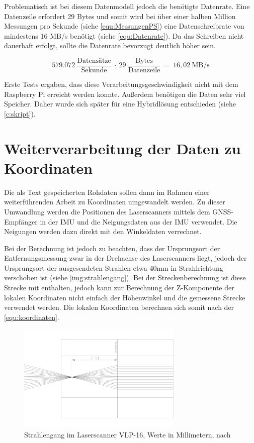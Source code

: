 \documentclass[a4paper,12pt,bibliography=totoc, listof=totoc,titlepage,pointlessnumbers]{scrreprt}
\begin{document}
Problematisch ist bei diesem Datenmodell jedoch die benötigte Datenrate. Eine Datenzeile erfordert 29 Bytes und somit wird bei über einer halben Million Messungen pro Sekunde (siehe \autoref{equ:MessungenPS}) eine Datenschreibrate von mindestens 16 MB/s benötigt (siehe \autoref{equ:Datenrate}). Da das Schreiben nicht dauerhaft erfolgt, sollte die Datenrate bevorzugt deutlich höher sein.

\begin{equation}
579.072~\frac{\text{Datens\"{a}tze}}{\text{Sekunde}}~\cdot~29~\frac{\text{Bytes}}{\text{Datenzeile}}~=~16,02~\text{MB/s}
\label{equ:Datenrate}
\end{equation}

Erste Tests ergaben, dass diese Verarbeitungsgeschwindigkeit nicht mit dem Raspberry Pi erreicht werden konnte. Außerdem benötigen die Daten sehr viel Speicher. Daher wurde sich später für eine Hybridlösung entschieden (siehe \autoref{c:skript}).

\section{Weiterverarbeitung der Daten zu Koordinaten}
Die als Text gespeicherten Rohdaten sollen dann im Rahmen einer weiterführenden Arbeit zu Koordinaten umgewandelt werden. Zu dieser Umwandlung werden die Positionen des Laser\-scan\-ners mittels dem GNSS-Empfänger in der IMU und die Neigungsdaten aus der IMU verwendet. Die Neigungen werden dazu direkt mit den Winkeldaten verrechnet.

Bei der Berechnung ist jedoch zu beachten, dass der Ursprungsort der Entfernungsmessung zwar in der Drehachse des Laser\-scan\-ners liegt, jedoch der Ursprungsort der ausgesendeten Strahlen etwa 40mm in Strahlrichtung verschoben ist (siehe \autoref{img:strahlengang}). Bei der Streckenberechnung ist diese Strecke mit enthalten, jedoch kann zur Berechnung der Z-Komponente der lokalen Koordinaten nicht einfach der Höhenwinkel und die gemessene Strecke verwendet werden. Die lokalen Koordinaten berechnen sich somit nach der \autoref{equ:koordinaten}.

\begin{figure}
 \centering
 \includegraphics[width=0.7\textwidth]{./img/Strahlengang.png}
 \caption{Strahlengang im Laser\-scan\-ner VLP-16, Werte in Millimetern, nach 
\citet{vlpCAD}}
 \label{img:strahlengang}
\end{figure}
\end{document}
